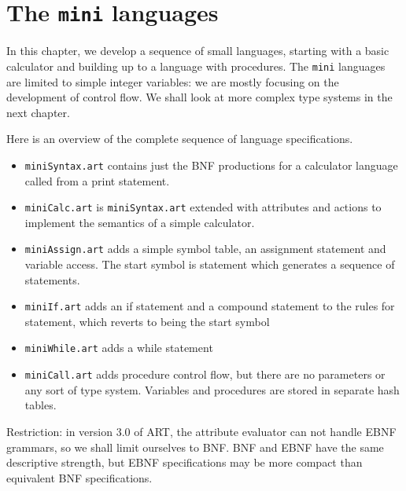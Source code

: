 \chapter{The {\tt mini} languages}
In this chapter, we develop a sequence of small languages, starting with a basic calculator and building up to a language with procedures. The {\tt mini} languages are limited to simple integer variables: we are mostly focusing on the development of control flow. We shall look at more complex type systems in the next chapter.

Here is an overview of the complete sequence of language specifications.
\begin{itemize}
\item {\tt miniSyntax.art} contains just the BNF productions for a calculator
language called from a print statement.

\item {\tt miniCalc.art} is {\tt miniSyntax.art} extended with attributes and actions to
implement the semantics of a simple calculator.

\item {\tt miniAssign.art} adds a simple symbol table, an assignment statement
and variable access. The start symbol is statement which generates a
sequence of statements.

\item {\tt miniIf.art} adds an if statement and a compound statement to the
rules for statement, which reverts to being the start symbol

\item {\tt miniWhile.art} adds a while statement

\item {\tt miniCall.art} adds procedure control flow, but there are no
parameters or any sort of type system. Variables and procedures are
stored in separate hash tables.
\end{itemize}
\begin{boxedminipage}{\textwidth}
Restriction: in version 3.0 of ART, the attribute evaluator can not handle EBNF grammars, so we shall limit ourselves to BNF. BNF and EBNF have the same descriptive strength, but EBNF specifications may be more compact than equivalent BNF specifications.
\end{boxedminipage}
\clearpage
